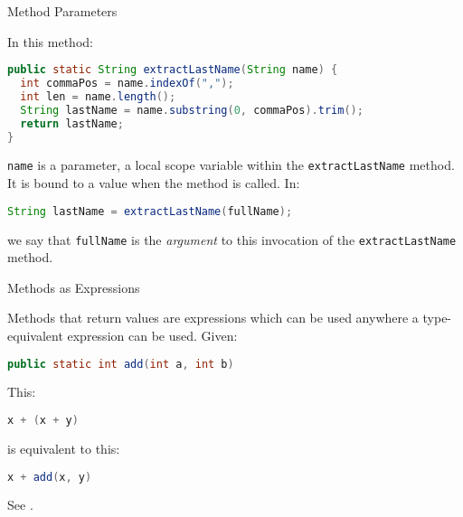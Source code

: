 \documentclass{beamer}
\begin{document}
\begin{frame}[fragile]{Method Parameters}

In this method:
\begin{lstlisting}[language=Java]
public static String extractLastName(String name) {
  int commaPos = name.indexOf(",");
  int len = name.length();
  String lastName = name.substring(0, commaPos).trim();
  return lastName;
}
\end{lstlisting}
{\tt name} is a parameter, a local scope variable within the {\tt extractLastName} method.  It is bound to a value when the method is called.  In:

\begin{lstlisting}[language=Java]
String lastName = extractLastName(fullName);
\end{lstlisting}
we say that {\tt fullName} is the {\it argument} to this invocation of the {\tt extractLastName} method.

\end{frame}


\begin{frame}[fragile]{Methods as Expressions}

Methods that return values are expressions which can be used anywhere a type-equivalent expression can be used.  Given:

\begin{lstlisting}[language=Java]
public static int add(int a, int b)
\end{lstlisting}
This:
\begin{lstlisting}[language=Java]
x + (x + y)
\end{lstlisting}
is equivalent to this:
\begin{lstlisting}[language=Java]
x + add(x, y)
\end{lstlisting}
See .

\end{frame}







\end{document}
